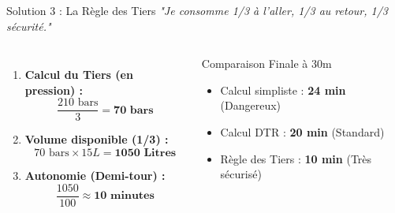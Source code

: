 \begin{frame}{Solution 3 : La Règle des Tiers}
    \textit{"Je consomme 1/3 à l'aller, 1/3 au retour, 1/3 sécurité."}
    \begin{columns}
        \begin{enumerate}
            \item \textbf{Calcul du Tiers (en pression) :}
            $$ \frac{210 \text{ bars}}{3} = \mathbf{70 \text{ bars}} $$
            
            \item \textbf{Volume disponible (1/3) :}
            $$ 70 \text{ bars} \times 15L = \mathbf{1050 \text{ Litres}} $$
            
            \item \textbf{Autonomie (Demi-tour) :}
            $$ \frac{1050}{100} \approx \mathbf{10 \text{ minutes}} $$
        \end{enumerate}

        \begin{exampleblock}{Comparaison Finale à 30m}
            \begin{itemize}
                \item Calcul simpliste : \textbf{24 min} (Dangereux)
                \item Calcul DTR : \textbf{20 min} (Standard)
                \item Règle des Tiers : \textbf{10 min} (Très sécurisé)
            \end{itemize}
        \end{exampleblock}
    \end{columns}
\end{frame}